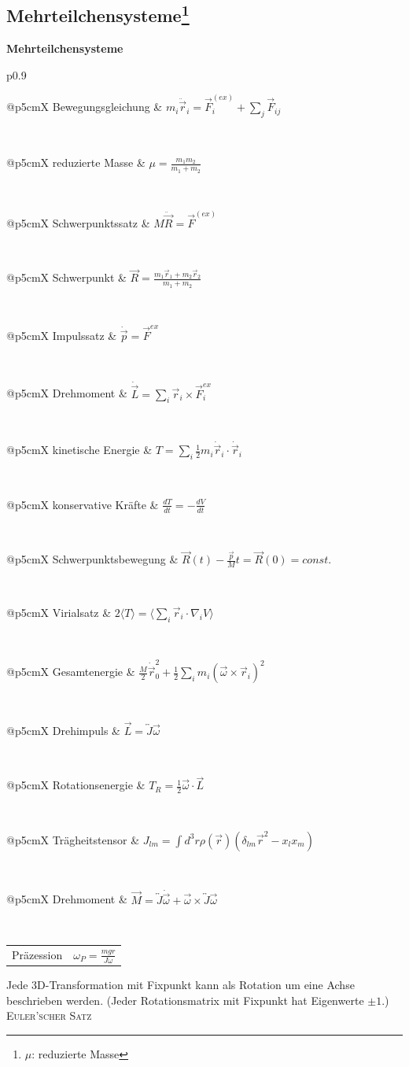 \documentclass[12pt,a4paper, twoside]{article}
\makeatletter
\renewcommand{\d}[2]{\frac{d #1}{d #2}}
\renewcommand{\=}[1]{\stackrel{#1}{=}}
\theoremstyle{definition}
\theoremstyle{remark}
\newcommand{\concept}[2]{%
\noindent
\begin{framed}
\noindent\textbf{#1}
\par\begin{tabular}{p{0.9\linewidth}}
#2
\end{tabular}
\end{framed}
}
\newcommand{\f}[2]{%
\noindent\begin{tabularx}{\linewidth}{@{}p{5cm}X}
#1 & $#2$
\end{tabularx}}
\makeatother
\begin{document}
\subsection[Mehrteilchensysteme]{Mehrteilchensysteme\let\thefootnote\relax\footnote{$\mu$: reduzierte Masse}}


\concept{Mehrteilchensysteme}{

\f{Bewegungsgleichung}{m_i \ddot{\vec{r}}_i = \vec{F}_i^{(ex)} + \sum_j \vec{F}_{ij}}\\
\f{reduzierte Masse}{\mu = \frac{m_1 m_2}{m_1 + m_2}}\\
\f{Schwerpunktssatz}{M \ddot{\vec{R}} = \vec{F}^{(ex)}}\\
\f{Schwerpunkt}{\vec{R} = \frac{m_1 \vec{r}_1 + m_2 \vec{r}_2}{m_1 + m_2}}\\
\f{Impulssatz}{\dot{\vec{p}} = \vec{F}^{ex}}\\
\f{Drehmoment}{\dot{\vec{L}} = \sum_i \vec{r}_i \times \vec{F}_i^{ex}}\\
\f{kinetische Energie}{T = \sum_i \frac{1}{2} m_i \dot{\vec{r}}_i \cdot \dot{\vec{r}}_i}\\
\f{konservative Kräfte}{\d{T}{t} = - \d{V}{t}}\\
\f{Schwerpunktsbewegung}{\vec{R}(t) - \frac{\vec{p}}{M}t = \vec{R}(0) = const.}\\
\f{Virialsatz}{2 \langle T \rangle = \langle \sum_i \vec{r}_i \cdot \nabla_i V \rangle}\\
\f{Gesamtenergie}{\frac{M}{2} \dot{\vec{r}}_0^2 + \frac{1}{2} \sum_i m_i (\vec{\omega} \times \vec{r}_i)^2}\\
\f{Drehimpuls}{\vec{L} = \overleftrightarrow{J}\vec{\omega}}\\
\f{Rotationsenergie}{T_R = \frac{1}{2} \vec{\omega} \cdot \vec{L}}\\
\f{Trägheitstensor}{J_{lm} = \int d^3 r \rho(\vec{r}) (\delta_{lm} \vec{r}^2 - x_l x_m)}\\
\f{Drehmoment}{\vec{M} = \overleftrightarrow{J} \dot{\vec{\omega}} + \vec{\omega} \times \overleftrightarrow{J} \vec{\omega}}\\
\f{Präzession}{\omega_P = \frac{m g r}{J \omega}}

}

\begin{center}
\begin{framed}
Jede 3D-Transformation mit Fixpunkt kann als Rotation um eine Achse beschrieben werden. (Jeder Rotationsmatrix mit Fixpunkt hat Eigenwerte $\pm 1$.)\\
\textsc{Euler'scher Satz}
\end{framed}
\end{center}
\end{document}
